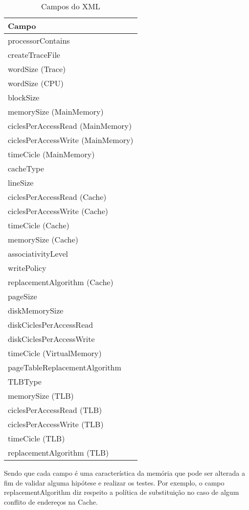 \documentclass[conference]{IEEEtran}
\begin{document}
\begin{table}[h!]
\centering
\begin{tabular}{|l|}
\hline
\textbf{Campo} \\ \hline
processorContains \\ \hline
createTraceFile \\ \hline
wordSize (Trace) \\ \hline
wordSize (CPU) \\ \hline
blockSize \\ \hline
memorySize (MainMemory) \\ \hline
ciclesPerAccessRead (MainMemory) \\ \hline
ciclesPerAccessWrite (MainMemory) \\ \hline
timeCicle (MainMemory) \\ \hline
cacheType \\ \hline
lineSize \\ \hline
ciclesPerAccessRead (Cache) \\ \hline
ciclesPerAccessWrite (Cache) \\ \hline
timeCicle (Cache) \\ \hline
memorySize (Cache) \\ \hline
associativityLevel \\ \hline
writePolicy \\ \hline
replacementAlgorithm (Cache) \\ \hline
pageSize \\ \hline
diskMemorySize \\ \hline
diskCiclesPerAccessRead \\ \hline
diskCiclesPerAccessWrite \\ \hline
timeCicle (VirtualMemory) \\ \hline
pageTableReplacementAlgorithm \\ \hline
TLBType \\ \hline
memorySize (TLB) \\ \hline
ciclesPerAccessRead (TLB) \\ \hline
ciclesPerAccessWrite (TLB) \\ \hline
timeCicle (TLB) \\ \hline
replacementAlgorithm (TLB) \\ \hline
\end{tabular}
\caption{Campos do XML}
\label{tab:xmlcampos}
\end{table}

Sendo que cada campo é uma característica da memória que pode ser alterada a fim de validar alguma hipótese e realizar os testes. Por exemplo, o campo replacementAlgorithm diz respeito a política de substituição no caso de algum conflito de endereços na Cache.
\end{document}
